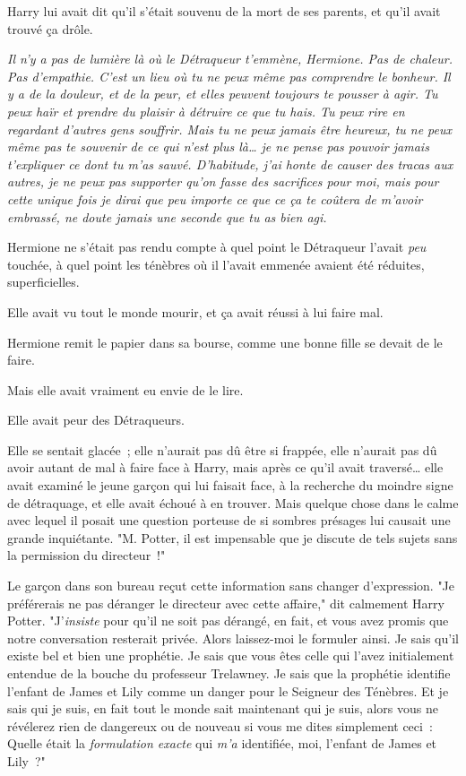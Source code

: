 Harry lui avait dit qu'il s'était souvenu de la mort de ses parents, et qu'il avait trouvé ça drôle.

\emph{Il n'y a pas de lumière là où le Détraqueur t'emmène, Hermione. Pas de chaleur. Pas d'empathie. C'est un lieu où tu ne peux même pas comprendre le bonheur. Il y a de la douleur, et de la peur, et elles peuvent toujours te pousser à agir. Tu peux haïr et prendre du plaisir à détruire ce que tu hais. Tu peux rire en regardant d'autres gens souffrir. Mais tu ne peux jamais être heureux, tu ne peux même pas te souvenir de ce qui n'est plus là… je ne pense pas pouvoir jamais t'expliquer ce dont tu m'as sauvé. D'habitude, j'ai honte de causer des tracas aux autres, je ne peux pas supporter qu'on fasse des sacrifices pour moi, mais pour cette unique fois je dirai que peu importe ce que ce ça te coûtera de m'avoir embrassé, ne doute jamais une seconde que tu as bien agi.}

Hermione ne s'était pas rendu compte à quel point le Détraqueur l'avait \emph{peu} touchée, à quel point les ténèbres où il l'avait emmenée avaient été réduites, superficielles.

Elle avait vu tout le monde mourir, et ça avait réussi à lui faire mal.

Hermione remit le papier dans sa bourse, comme une bonne fille se devait de le faire.

Mais elle avait vraiment eu envie de le lire.

Elle avait peur des Détraqueurs.


Elle se sentait glacée~; elle n'aurait pas dû être si frappée, elle n'aurait pas dû avoir autant de mal à faire face à Harry, mais après ce qu'il avait traversé… elle avait examiné le jeune garçon qui lui faisait face, à la recherche du moindre signe de détraquage, et elle avait échoué à en trouver. Mais quelque chose dans le calme avec lequel il posait une question porteuse de si sombres présages lui causait une grande inquiétante. "M. Potter, il est impensable que je discute de tels sujets sans la permission du directeur~!"

Le garçon dans son bureau reçut cette information sans changer d'expression. "Je préférerais ne pas déranger le directeur avec cette affaire," dit calmement Harry Potter. "J'\emph{insiste} pour qu'il ne soit pas dérangé, en fait, et vous avez promis que notre conversation resterait privée. Alors laissez-moi le formuler ainsi. Je sais qu'il existe bel et bien une prophétie. Je sais que vous êtes celle qui l'avez initialement entendue de la bouche du professeur Trelawney. Je sais que la prophétie identifie l'enfant de James et Lily comme un danger pour le Seigneur des Ténèbres. Et je sais qui je suis, en fait tout le monde sait maintenant qui je suis, alors vous ne révélerez rien de dangereux ou de nouveau si vous me dites simplement ceci~: Quelle était la \emph{formulation exacte} qui \emph{m'a} identifiée, moi, l'enfant de James et Lily~?"

